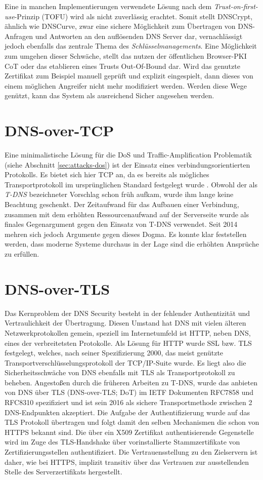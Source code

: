 Eine in manchen Implementierungen verwendete Lösung nach dem \textit{Trust-on-first-use}-Prinzip (TOFU) wird als nicht zuverlässig erachtet.\cite{Wendlandt2008} Somit stellt DNSCrypt, ähnlich wie DNSCurve, zwar eine sichere  Möglichkeit zum Übertragen von DNS-Anfragen und Antworten an den auflösenden DNS Server dar, vernachlässigt jedoch ebenfalls das zentrale Thema des \textit{Schlüsselmanagements}. Eine Möglichkeit zum umgehen dieser Schwäche, stellt das nutzen der öffentlichen Browser-PKI CoT oder das etablieren eines Trusts Out-Of-Bound dar. Wird das genutzte Zertifikat zum Beispiel manuell geprüft und explizit eingespielt, dann dieses von einem möglichen Angreifer nicht mehr modifiziert werden. Werden diese Wege genützt, kann das System als ausreichend Sicher angesehen werden.

\section{DNS-over-TCP}
Eine minimalistische Lösung für die DoS und Traffic-Amplification Problematik (siehe Abschnitt \ref{sec:attacks-dos}) ist der Einsatz eines verbindungsorientierten Protokolls. Es bietet sich hier TCP an, da es bereits als mögliches Transportprotokoll im ursprünglichen Standard festgelegt wurde \cite{rfc1035}. Obwohl der als \textit{T-DNS} bezeichneter Vorschlag schon früh aufkam, wurde ihm lange keine Beachtung geschenkt. Der Zeitaufwand für das Aufbauen einer Verbindung, zusammen mit dem erhöhten Ressourcenaufwand auf der Serverseite wurde als finales Gegenargument gegen den Einsatz von T-DNS verwendet. Seit 2014 mehren sich jedoch Argumente gegen dieses Dogma. Es konnte klar feststellen werden, dass moderne Systeme durchaus in der Lage sind die erhöhten Ansprüche zu erfüllen\cite{Zhu2015}. 

\section{DNS-over-TLS}
\label{sec:tec-dot}
Das Kernproblem der DNS Security besteht in der fehlender Authentizität und Vertraulichkeit der Übertragung. Diesen Umstand hat DNS mit vielen älteren Netzwerkprotokollen gemein, speziell im Internetumfeld ist HTTP, neben DNS, eines der verbreitetsten Protokolle. Als Lösung für HTTP wurde SSL bzw. TLS festgelegt, welches, nach seiner Spezifizierung 2000, das meist genützte Transportverschlüsselungsprotokoll der TCP/IP-Suite wurde. Es liegt also die Sicherheitsschwäche von DNS ebenfalls mit TLS als Transportprotokoll zu beheben. 
Angestoßen durch die früheren Arbeiten zu T-DNS, wurde das anbieten von DNS über TLS (DNS-over-TLS; DoT) im IETF Dokumenten RFC7858\cite{rfc7858} und RFC8310\cite{Dickinson2018} spezifiziert und ist sein 2016 als sichere Transportmethode zwischen 2 DNS-Endpunkten akzeptiert. Die Aufgabe der Authentifizierung wurde auf das TLS Protokoll übertragen und folgt damit den selben Mechanismen die schon von HTTPS bekannt sind. Die über ein X509 Zertifikat authentisierende Gegenstelle wird im Zuge des TLS-Handshake über vorinstallierte Stammzertifikate von Zertifizierungsstellen authentifiziert. Die Vertrauensstellung zu den Zielservern ist daher, wie bei HTTPS, implizit transitiv über das Vertrauen zur ausstellenden Stelle des Serverzertifikats hergestellt.

